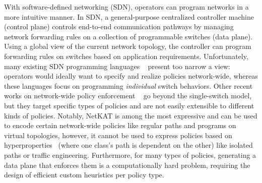 

With software-defined networking (SDN),
operators can program networks in a more intuitive manner. In SDN, a
general-purpose centralized controller machine (control plane)
controls end-to-end communication pathways by managing network
forwarding rules on a collection of programmable switches (data
plane). Using a global view of the current network topology, the
controller can program forwarding rules on switches based on
application requirements.
Unfortunately, many existing SDN programming languages 
~\cite{frenetic,pyretic} present too
narrow a view: operators would ideally want to specify and realize
policies network-wide, whereas these languages focus on
programming {\em individual} switch behaviors. 
 Other recent works on
 network-wide policy enforcement
 ~\cite{merlin,simple,fattire, netkat, netkatcompiler, sol} 
 go beyond the
 single-switch model, but they target specific types of policies 
 and are not easily extensible to different kinds of policies. 
 Notably,
NetKAT is among the most expressive and
can be used to encode certain network-wide policies like regular paths and 
programs on virtual topologies, however, it cannot be used to 
express policies based on hyperproperties~\cite{hyperproperties} 
(where one class's path is dependent on the other) like isolated paths or traffic engineering. 
Furthermore, for many
types of policies, generating a data plane that enforces them is a
computationally hard problem, requiring the design of efficient custom
heuristics per policy type.







